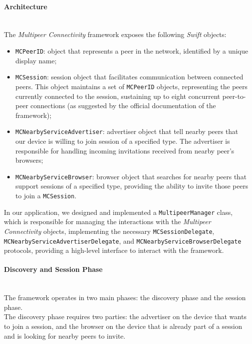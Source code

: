 \documentclass[conference]{IEEEtran}
\begin{document}
\paragraph*{\textbf{Architecture}}~\\
The \textit{Multipeer Connectivity} framework exposes the following
\textit{Swift} objects:  
\begin{itemize}
    \item \texttt{MCPeerID}: object that represents a peer in the network,
    identified by a unique display name;
    \item \texttt{MCSession}: session object that facilitates communication between
    connected peers. This object maintains a set of \texttt{MCPeerID}
    objects, representing the peers currently connected to the session,
    sustaining up to eight concurrent peer-to-peer connections (as suggested by
    the official documentation of the framework); 
    \item \texttt{MCNearbyServiceAdvertiser}: advertiser object that tell nearby
    peers that our device is willing to join session of a specified type. The
    advertiser is responsible for handling incoming invitations received from
    nearby peer's browsers; 
    \item \texttt{MCNearbyServiceBrowser}: browser object that searches for
    nearby peers that support sessions of a specified type, providing the
    ability to invite those peers to join a \texttt{MCSession}.
\end{itemize}
In our application, we designed and implemented a \texttt{MultipeerManager}
class, which is responsible for managing the interactions with the
\textit{Multipeer Connectivity} objects, implementing the necessary
\texttt{MCSessionDelegate}, \texttt{MCNearbyServiceAdvertiserDelegate}, and
\texttt{MCNearbyServiceBrowserDelegate} protocols, providing a high-level
interface to interact with the framework.\\

\paragraph*{\textbf{Discovery and Session Phase}}~\\
The framework operates in two main phases: the discovery phase and the session
phase.\\ 

The discovery phase requires two parties: the advertiser on the device that
wants to join a session, and the browser on the device that is already part of a
session and is looking for nearby peers to invite. \\
\end{document}
